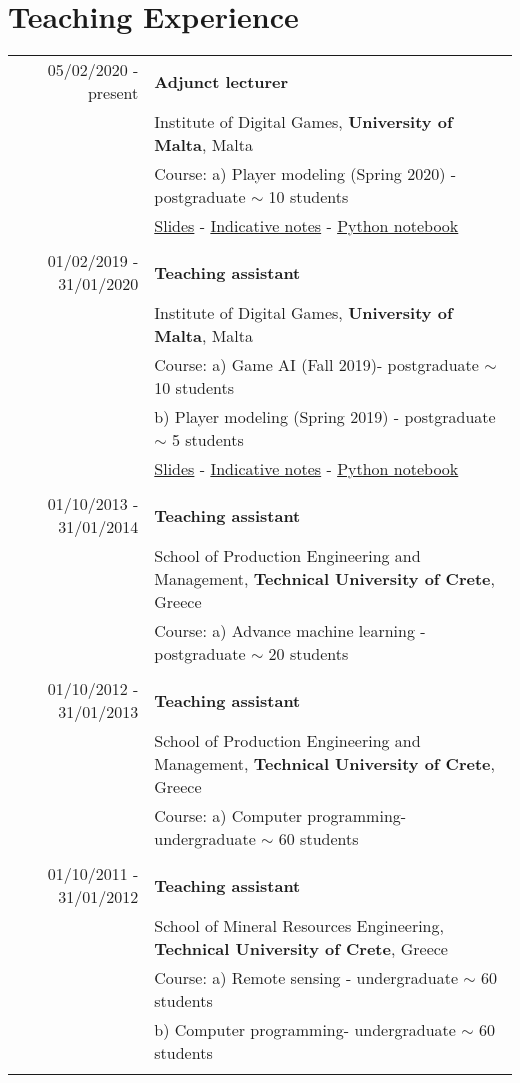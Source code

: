 \documentclass[a4paper,10pt]{article}
\begin{document}
\section{Teaching Experience}
\begin{longtable}{r|p{11cm}}
05/02/2020 - present& \textbf{Adjunct lecturer}\\
& Institute of Digital Games, \textbf{University of Malta}, Malta \\
& Course: a) Player modeling (Spring 2020) - postgraduate $\sim$ 10 students\\
& \hspace{0.475in} \href{https://bit.ly/2Fv6GRy}{Slides} - \href{https://bit.ly/2Wt5ftS}{Indicative notes} - \href{http://www.kmakantasis.gr/Trees.html}{Python notebook}\\
\multicolumn{2}{c}{} \\
	
01/02/2019 - 31/01/2020& \textbf{Teaching assistant}\\
& Institute of Digital Games, \textbf{University of Malta}, Malta \\
& Course: a) Game AI (Fall 2019)- postgraduate $\sim$ 10 students\\
& \hspace{0.475in} b) Player modeling (Spring 2019) - postgraduate $\sim$ 5 students\\
& \hspace{0.475in} \href{https://bit.ly/2Fv6GRy}{Slides} - \href{https://bit.ly/2Wt5ftS}{Indicative notes} - \href{http://www.kmakantasis.gr/Trees.html}{Python notebook}\\
\multicolumn{2}{c}{} \\
	
01/10/2013 - 31/01/2014 & \textbf{Teaching assistant}\\
& School of Production Engineering and Management, \textbf{Technical University of Crete}, Greece\\
& Course: a) Advance machine learning - postgraduate $\sim$ 20 students\\
\multicolumn{2}{c}{} \\

01/10/2012 - 31/01/2013 & \textbf{Teaching assistant}\\
& School of Production Engineering and Management, \textbf{Technical University of Crete}, Greece\\
& Course: a) Computer programming- undergraduate $\sim$ 60 students\\
\multicolumn{2}{c}{} \\

01/10/2011 - 31/01/2012 & \textbf{Teaching assistant}\\
& School of Mineral Resources Engineering, \textbf{Technical University of Crete}, Greece\\
& Course: a) Remote sensing - undergraduate $\sim$ 60 students\\
& \hspace{0.475in} b) Computer programming- undergraduate $\sim$ 60 students\\
\multicolumn{2}{c}{} \\

\end{longtable}
\end{document}

